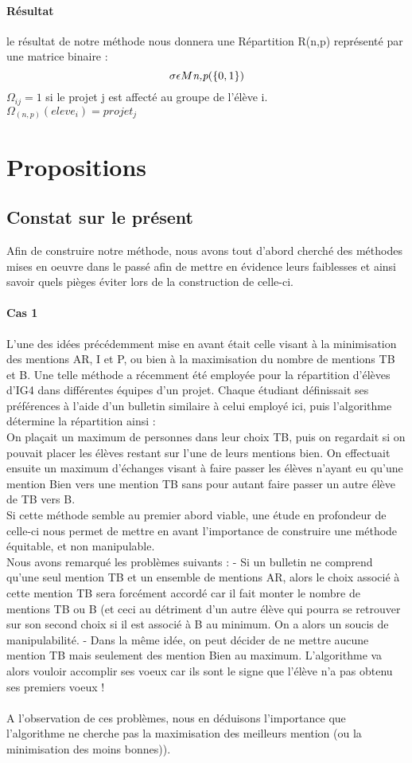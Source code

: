 \documentclass[10pt,a4paper]{scrartcl}
\begin{document}
\paragraph{Résultat}
le résultat de notre méthode nous donnera une Répartition R(n,p) représenté par une matrice binaire :
$$\sigma\epsilon M\emph{n,p}(\lbrace0,1\rbrace)$$
$\Omega_{ij}=1$ si le projet j est affecté au groupe de l'élève i.\\
$\Omega_{(n,p)}(eleve_{i})=projet_{j}$

\section{Propositions}
\subsection{Constat sur le présent}
Afin de construire notre méthode, nous avons tout d'abord cherché des méthodes mises en oeuvre dans le passé afin de mettre en évidence leurs faiblesses et ainsi savoir quels pièges éviter lors de la construction de celle-ci.\\
\paragraph{Cas 1}
L'une des idées précédemment mise en avant était celle visant à la minimisation des mentions AR, I et P, ou bien  à la maximisation du nombre de mentions TB et B.
Une telle méthode a récemment été employée pour la répartition d'élèves d'IG4 dans différentes équipes d'un projet. Chaque étudiant définissait ses préférences à l'aide d'un bulletin similaire à celui employé ici, puis l'algorithme détermine la répartition ainsi :\\
On plaçait un maximum de personnes dans leur choix TB, puis on regardait si on pouvait placer les élèves restant sur l'une de leurs mentions bien. On effectuait ensuite un maximum d'échanges visant à faire passer les élèves n'ayant eu qu'une mention Bien vers une mention TB sans pour autant faire passer un autre élève de TB vers B.\\
Si cette méthode semble au premier abord viable, une étude en profondeur de celle-ci nous permet de mettre en avant l'importance de construire une méthode équitable, et non manipulable.\\
Nous avons remarqué les problèmes suivants : 
- Si un bulletin ne comprend qu'une seul mention TB et un ensemble de mentions AR, alors le choix associé à cette mention TB sera forcément accordé car il fait monter le nombre de mentions TB ou B (et ceci au détriment d'un autre élève qui pourra se retrouver sur son second choix si il est associé à B au minimum. On a alors un soucis de manipulabilité.
- Dans la même idée, on peut décider de ne mettre aucune mention TB mais seulement des mention Bien au maximum. L'algorithme va alors vouloir accomplir ses voeux car ils sont le signe que l'élève n'a pas obtenu ses premiers voeux !\\
\\
A l'observation de ces problèmes, nous en déduisons l'importance que l'algorithme ne cherche pas la maximisation des meilleurs mention (ou la minimisation des moins bonnes)).
\end{document}
